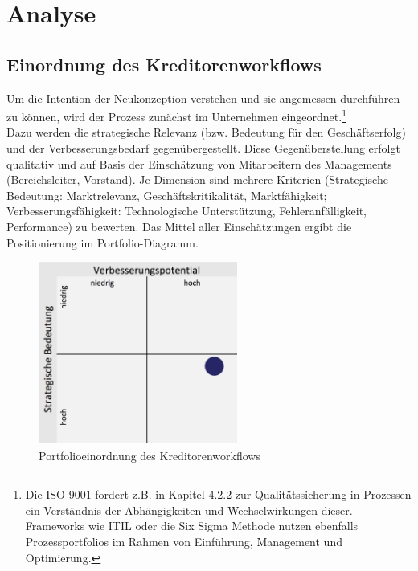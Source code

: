 \chapter{Analyse}

\section{Einordnung des Kreditorenworkflows}
Um die Intention der Neukonzeption verstehen und sie angemessen durchführen zu können, wird der Prozess zunächst im Unternehmen eingeordnet.\footnote{Die ISO 9001 fordert z.B. in Kapitel 4.2.2 zur Qualitätssicherung in Prozessen ein Verständnis der Abhängigkeiten und Wechselwirkungen dieser. Frameworks wie ITIL oder die Six Sigma Methode nutzen ebenfalls Prozessportfolios im Rahmen von Einführung, Management und Optimierung.}\\
Dazu werden die strategische Relevanz (bzw. Bedeutung für den Geschäftserfolg) und der Verbesserungsbedarf gegenübergestellt. 
Diese Gegenüberstellung erfolgt qualitativ und auf Basis der Einschätzung von Mitarbeitern des Managements (Bereichsleiter, Vorstand).
Je  Dimension sind mehrere Kriterien (Strategische Bedeutung: Marktrelevanz, Geschäftskritikalität, Marktfähigkeit; Verbesserungsfähigkeit: Technologische Unterstützung, Fehleranfälligkeit, Performance) zu bewerten. 
Das Mittel aller Einschätzungen ergibt die Positionierung im Portfolio-Diagramm.

\begin{figure}[!htb]
\centering
\includegraphics[height=60mm]{images/portfolio}
\caption{Portfolioeinordnung des Kreditorenworkflows \protect\footnotemark}
\label{Portfolioeinordnung des Kreditorenworkflows}
\end{figure}

